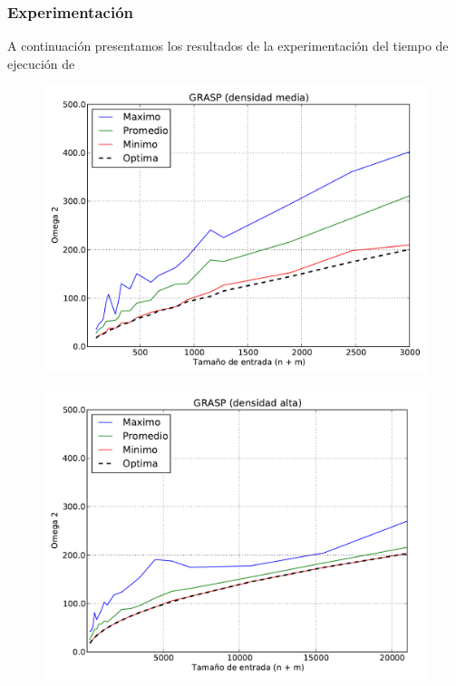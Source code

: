 \subsubsection{Experimentación}

A continuación presentamos los resultados de la experimentación del tiempo de ejecución de

\begin{figure}[H]
\begin{center}
\includegraphics[angle=0, scale=.75]{imagenes/calidad_grasp_2014-06-27_08-58-53.pdf}
\label{grafico local}
\end{center}
\end{figure}

\begin{figure}[H]
\begin{center}
\includegraphics[angle=0, scale=.75]{imagenes/calidad_grasp_2014-06-27_08-54-46.pdf}
\label{grafico local}
\end{center}
\end{figure}
